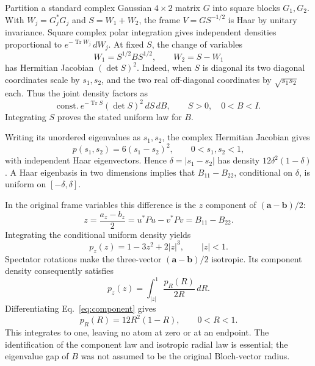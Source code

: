 \documentclass[aps,pra,reprint,amsmath,amssymb,longbibliography]{revtex4-2}
\newcommand{\Tr}{\operatorname{Tr}}
\begin{document}
Partition a standard complex Gaussian $4\times2$ matrix $G$ into square blocks $G_1,G_2$. With $W_j=G_j^*G_j$ and $S=W_1+W_2$, the frame $V=GS^{-1/2}$ is Haar by unitary invariance. Square complex polar integration gives independent densities proportional to $e^{-\Tr W_j}\,dW_j$. At fixed $S$, the change of variables
\begin{equation}
 W_1=S^{1/2}BS^{1/2},\qquad W_2=S-W_1
\end{equation}
has Hermitian Jacobian $(\det S)^2$. Indeed, when $S$ is diagonal its two diagonal coordinates scale by $s_1,s_2$, and the two real off-diagonal coordinates by $\sqrt{s_1s_2}$ each. Thus the joint density factors as
\begin{equation}
 \text{const.}\ e^{-\Tr S}(\det S)^2\,dS\,dB,
 \qquad S>0,\quad 0<B<I.
\end{equation}
Integrating $S$ proves the stated uniform law for $B$.

Writing its unordered eigenvalues as $s_1,s_2$, the complex Hermitian Jacobian gives
\begin{equation}
 p(s_1,s_2)=6(s_1-s_2)^2,\qquad 0<s_1,s_2<1,
\end{equation}
with independent Haar eigenvectors. Hence $\delta=|s_1-s_2|$ has density $12\delta^2(1-\delta)$. A Haar eigenbasis in two dimensions implies that $B_{11}-B_{22}$, conditional on $\delta$, is uniform on $[-\delta,\delta]$.

In the original frame variables this difference is the $z$ component of $(\bm a-\bm b)/2$:
\begin{equation}
 z=\frac{a_z-b_z}{2}=u^*Pu-v^*Pv=B_{11}-B_{22}.
\end{equation}
Integrating the conditional uniform density yields
\begin{equation}
 p_z(z)=1-3z^2+2|z|^3,\qquad |z|<1.
\label{eq:component}
\end{equation}
Spectator rotations make the three-vector $(\bm a-\bm b)/2$ isotropic. Its component density consequently satisfies
\begin{equation}
 p_z(z)=\int_{|z|}^1\frac{p_R(R)}{2R}\,dR.
\end{equation}
Differentiating Eq.~\eqref{eq:component} gives
\begin{equation}
 p_R(R)=12R^2(1-R),\qquad 0<R<1.
\label{eq:radial}
\end{equation}
This integrates to one, leaving no atom at zero or at an endpoint. The identification of the component law and isotropic radial law is essential; the eigenvalue gap of $B$ was not assumed to be the original Bloch-vector radius.
\end{document}
